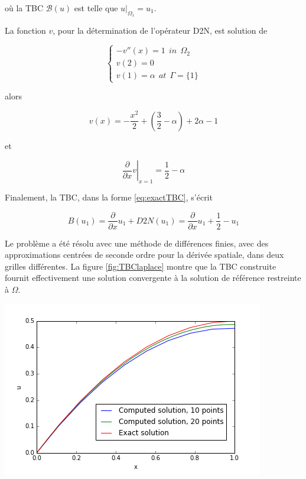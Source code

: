 \noindent où la TBC $\mathcal{B}(u)$ est telle que $u|_{\Omega_1} = u_1$.

\indent La fonction $v$, pour la détermination de l'opérateur D2N, est solution de

\begin{equation*}
\begin{cases}
-v''(x) = 1 \ \ in \ \ \Omega_2\\
v(2) = 0 \\
v(1) = \alpha \ \ at \ \ \Gamma=\{1\}
\end{cases}
\end{equation*}

\noindent alors

$$v(x) = -\frac{x^2}{2} + \left(\frac{3}{2} - \alpha \right) + 2\alpha -1$$

\noindent et

$$\left. \frac{\partial}{\partial x}v \right\rvert_{x=1} = \frac{1}{2} - \alpha$$

\indent Finalement, la TBC, dans la forme \eqref{eq:exactTBC}, s'écrit

$$B(u_1) = \frac{\partial}{\partial x}u_1 + D2N(u_1) = \frac{\partial}{\partial x}u_1+ \frac{1}{2} - u_1$$

\indent Le problème a été résolu avec une méthode de différences finies, avec des approximations centrées de seconde ordre pour la dérivée spatiale, dans deux grilles différentes. La figure \ref{fig:TBClaplace} montre que la TBC construite fournit effectivement une solution convergente à la solution de référence restreinte à $\Omega$.

\begin{center}
	\includegraphics[scale=.5]{figures/TBClaplace.png}
\end{center}

